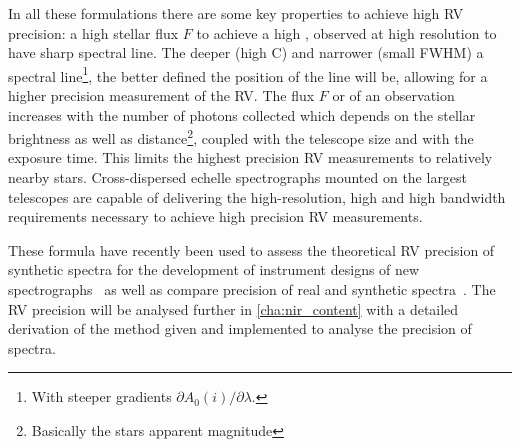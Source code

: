 In all these formulations there are some key properties to achieve high RV precision: a high stellar flux $F$ to achieve a high \snr{}, observed at high resolution to have sharp spectral line.
The deeper (high C) and narrower (small FWHM) a spectral line\footnote{With steeper gradients $\partial A_0(i)/\partial\lambda$.}, the better defined the position of the line will be, allowing for a higher precision measurement of the RV.
The flux $F$ or \snr{} of an observation increases with the number of photons collected which depends on the stellar brightness as well as distance\footnote{Basically the stars apparent magnitude}, coupled with the telescope size and with the exposure time.
This limits the highest precision RV measurements to relatively nearby stars.
Cross-dispersed echelle spectrographs mounted on the largest telescopes are capable of delivering the high-resolution, high \snr{} and high bandwidth requirements necessary to achieve high precision RV measurements.

These formula have recently been used to assess the theoretical RV precision of synthetic spectra for the development of instrument designs of new \nir{} spectrographs~\citep[e.g.][]{figueira_radial_2016} as well as compare precision of real and synthetic spectra~\citep[e.g.][]{artigau_optical_2018}.
The RV precision will be analysed further in \cref{cha:nir_content} with a detailed derivation of the \citet{bouchy_fundamental_2001} method given and implemented to analyse the precision of \nir{} spectra.
